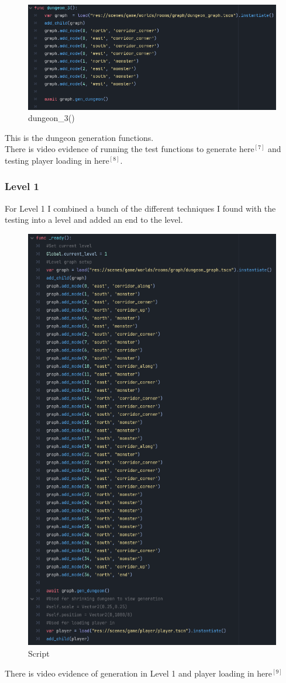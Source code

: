 \documentclass{article}
\begin{document}
                \begin{figure}[H]
                        \centering
                        \includegraphics[width = 0.8\columnwidth]{images/development/RoomTest_dungeon_3.PNG}
                        \caption{dungeon\_3()}
                \end{figure} 
        This is the dungeon generation functions.\\
        There is video evidence of running the test functions to generate here$^{[7]}$ and testing player loading in here$^{[8]}$.
        \subsubsection{Level 1}
        For Level 1 I combined a bunch of the different techniques I found with the testing into a level and added an end to the level.\\
        \begin{figure}[H]
                \centering
                \includegraphics[width = 0.8\columnwidth]{images/development/Level1_script.PNG}
                \caption{Script}
        \end{figure}
        There is video evidence of generation in Level 1 and player loading in here$^{[9]}$
        \newpage
\end{document}
